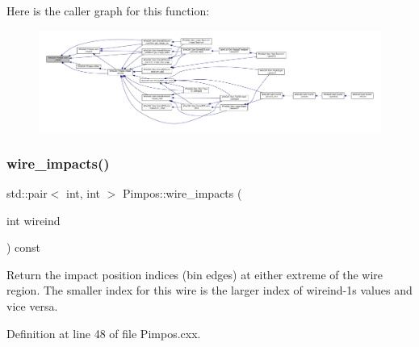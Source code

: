 Here is the caller graph for this function\+:
\nopagebreak
\begin{figure}[H]
\begin{center}
\leavevmode
\includegraphics[width=350pt]{class_wire_cell_1_1_pimpos_ae91d0c7565196dba1fbf9bd83760d25e_icgraph}
\end{center}
\end{figure}
\mbox{\label{class_wire_cell_1_1_pimpos_a185f13fbfd5be1350fe5ba268f7557ca}} 
\subsubsection{\texorpdfstring{wire\+\_\+impacts()}{wire\_impacts()}}
{\footnotesize\ttfamily std\+::pair$<$ int, int $>$ Pimpos\+::wire\+\_\+impacts (\begin{DoxyParamCaption}\item[{int}]{wireind }\end{DoxyParamCaption}) const}

Return the impact position indices (bin edges) at either extreme of the wire region. The smaller index for this wire is the larger index of wireind-\/1\textquotesingle{}s values and vice versa. 

Definition at line 48 of file Pimpos.\+cxx.

